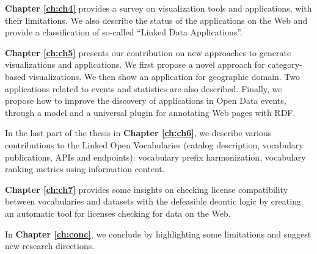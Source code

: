 \textbf{Chapter \ref{ch:ch4}} provides a survey on visualization tools and applications, with their limitations. We also describe the status of the applications on the Web and provide a classification of so-called ``Linked Data Applications''.

\textbf{Chapter \ref{ch:ch5}} presents our contribution on new approaches to generate visualizations and applications. We first propose a novel approach for category-based visualizations. We then show an application for geographic domain. Two applications related to events and statistics are also described. Finally, we propose how to improve the discovery of applications in Open Data events, through a model and a universal plugin for annotating Web pages with RDF.

In the last part of the thesis in \textbf{Chapter \ref{ch:ch6}}, we describe various contributions to the Linked Open Vocabularies (catalog description, vocabulary publications, APIs and endpoints): vocabulary prefix harmonization, vocabulary ranking metrics using information content.

\textbf{Chapter \ref{ch:ch7}} provides some insights on checking license compatibility between vocabularies and datasets with the defeasible deontic logic by creating an automatic tool for licenses checking for data on the Web.

In \textbf{Chapter \ref{ch:conc}}, we conclude by highlighting some limitations and suggest new research directions.
